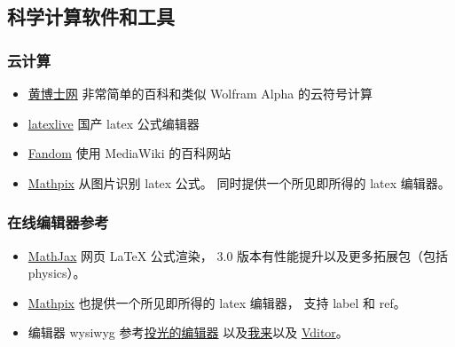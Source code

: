 \subsection{科学计算软件和工具}
\subsubsection{云计算}
\begin{itemize}
\item \href{http://www.drhuang.com/}{黄博士网} 非常简单的百科和类似 Wolfram Alpha 的云符号计算
\item \href{https://www.latexlive.com/}{latexlive} 国产 latex 公式编辑器
\item \href{https://harrypotter.fandom.com}{Fandom} 使用 MediaWiki 的百科网站
\item \href{https://mathpix.com}{Mathpix} 从图片识别 latex 公式。 同时提供一个所见即所得的 latex 编辑器。
\end{itemize}

\subsubsection{在线编辑器参考}
\begin{itemize}
\item \href{https://www.mathjax.org/}{MathJax} 网页 LaTeX 公式渲染， 3.0 版本有性能提升以及更多拓展包（包括 physics）。
\item \href{https://mathpix.com/ocr?gclid=CjwKCAiAy_CcBhBeEiwAcoMRHKnSPGjROmFGBj5R_Ev3hke7lG7xNIzKDHv5FgkMFq62aXRpISt_LhoC47YQAvD_BwE}{Mathpix} 也提供一个所见即所得的 latex 编辑器， 支持 label 和 ref。
\item 编辑器 wysiwyg 参考\href{https://editoe.com/}{投光的编辑器} 以及\href{https://www.wolai.com/}{我来}以及 \href{https://github.com/Vanessa219/vditor}{Vditor}。
\end{itemize}
